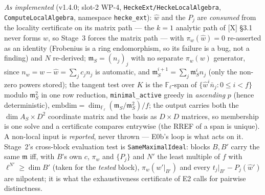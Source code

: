 \documentclass[11pt]{article}
\theoremstyle{remark}
\newcommand{\F}{\mathbb{F}}
\newcommand{\Fl}{\F_\ell}
\newcommand{\m}{\mathfrak{m}}
\begin{document}
\noindent\emph{As implemented} (v1.4.0; slot-2 WP-4, \texttt{HeckeExt/HeckeLocalAlgebra},
\texttt{ComputeLocalAlgebra}, namespace \texttt{hecke\_ext}): $\hat w$ and the $P_j$ are
\emph{consumed} from the locality certificate on its matrix path --- the $k=1$ analytic path of
[X] \S3.1 never forms $\hat w$, so Stage~3 forces the matrix path --- with $\pi_w(\hat w)=0$
re-asserted as an identity (Frobenius is a ring endomorphism, so its failure is a bug, not a
finding) and $N$ re-derived; $\m_S=(n_j)_j$ with no separate $\pi_w(w)$ generator, since
$n_w=w-\hat w=\sum_jc_jn_j$ is automatic, and $\m_S^{i+1}=\sum_j\m_S^in_j$ (only the non-zero
powers stored); the tangent test over $K$ is the $\Fl$-span of $\{\hat w^i\bar n_j:0\le i<f\}$
modulo $\m_S^2$ in one row reduction, \texttt{minimal\_active} greedy in \emph{ascending} $p$
(hence deterministic), $\mathrm{embdim}=\dim_{\Fl}(\m_S/\m_S^2)/f$; the output carries both the
$\dim A_S\times D^2$ coordinate matrix and the basis as $D\times D$ matrices, so membership is
one solve and a certificate compares entrywise (the RREF of a span is unique). A non-local input
is \emph{reported}, never thrown --- E0b's loop is what acts on it. Stage~2's cross-block
evaluation test is \texttt{SameMaximalIdeal}: blocks $B,B'$ carry the same $\m$ iff, with $B$'s
own $c$, $\pi_w$ and $\{P_j\}$ and $N'$ the least multiple of $f$ with $\ell^{N'}\ge\dim B'$
(taken for the \emph{tested} block), $\pi_w(w'|_{B'})$ and every $t_j|_{B'}-P_j(\hat w')$ are
nilpotent; it is what the exhaustiveness certificate of E2 calls for pairwise distinctness.
\end{document}
